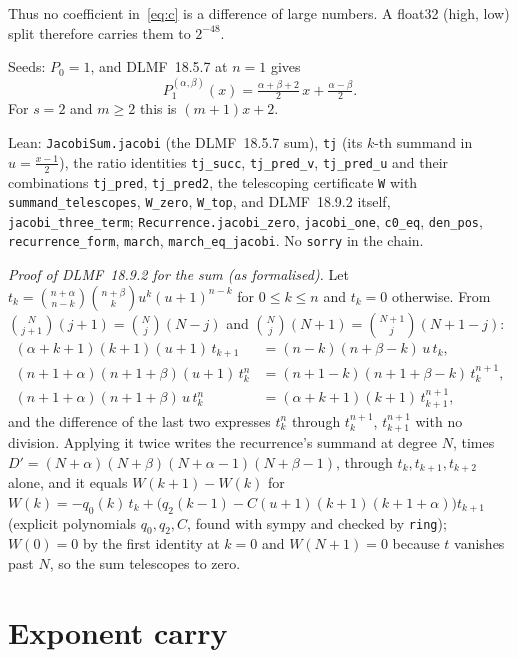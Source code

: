 \documentclass[11pt,a4paper]{article}
\numberwithin{equation}{section}
\begin{document}
Thus no coefficient in~\eqref{eq:c} is a difference of large numbers.
A float32 (high, low) split therefore carries them to $2^{-48}$.

Seeds: $P_0=1$, and DLMF~18.5.7 at $n=1$ gives
\begin{equation}
\label{eq:P1}
P_1^{(\alpha,\beta)}(x)
  =\tfrac{\alpha+\beta+2}{2}\,x+\tfrac{\alpha-\beta}{2}.
\end{equation}
For $s=2$ and $m\ge 2$ this is $(m+1)x+2$.

Lean: \texttt{JacobiSum.jacobi} (the DLMF~18.5.7 sum), \texttt{tj} (its
$k$-th summand in $u=\tfrac{x-1}{2}$), the ratio identities
\texttt{tj\_succ}, \texttt{tj\_pred\_v}, \texttt{tj\_pred\_u} and their
combinations \texttt{tj\_pred}, \texttt{tj\_pred2}, the telescoping
certificate \texttt{W} with \texttt{summand\_telescopes}, \texttt{W\_zero},
\texttt{W\_top}, and DLMF~18.9.2 itself, \texttt{jacobi\_three\_term};
\texttt{Recurrence.jacobi\_zero}, \texttt{jacobi\_one}, \texttt{c0\_eq},
\texttt{den\_pos}, \texttt{recurrence\_form}, \texttt{march},
\texttt{march\_eq\_jacobi}.  No \texttt{sorry} in the chain.

\emph{Proof of DLMF~18.9.2 for the sum (as formalised).}  Let
$t_k=\binom{n+\alpha}{n-k}\binom{n+\beta}{k}u^k(u+1)^{n-k}$ for $0\le k\le n$
and $t_k=0$ otherwise.  From $\binom{N}{j+1}(j+1)=\binom{N}{j}(N-j)$ and
$\binom{N}{j}(N+1)=\binom{N+1}{j}(N+1-j)$:
\begin{align*}
(\alpha+k+1)(k+1)(u+1)\,t_{k+1}&=(n-k)(n+\beta-k)\,u\,t_k,\\
(n+1+\alpha)(n+1+\beta)(u+1)\,t^{n}_k&=(n+1-k)(n+1+\beta-k)\,t^{n+1}_k,\\
(n+1+\alpha)(n+1+\beta)\,u\,t^{n}_k&=(\alpha+k+1)(k+1)\,t^{n+1}_{k+1},
\end{align*}
and the difference of the last two expresses $t^n_k$ through $t^{n+1}_k$,
$t^{n+1}_{k+1}$ with no division.  Applying it twice writes the recurrence's
summand at degree $N$, times $D'=(N+\alpha)(N+\beta)(N+\alpha-1)(N+\beta-1)$,
through $t_k,t_{k+1},t_{k+2}$ alone, and it equals $W(k+1)-W(k)$ for
$W(k)=-q_0(k)\,t_k+\bigl(q_2(k-1)-C(u+1)(k+1)(k+1+\alpha)\bigr)t_{k+1}$
(explicit polynomials $q_0,q_2,C$, found with sympy and checked by
\texttt{ring}); $W(0)=0$ by the first identity at $k=0$ and $W(N+1)=0$
because $t$ vanishes past $N$, so the sum telescopes to zero.

\section{Exponent carry}
\label{sec:carry}
\end{document}
